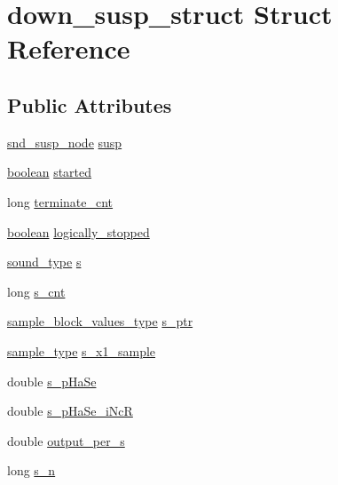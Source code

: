 \hypertarget{structdown__susp__struct}{}\section{down\+\_\+susp\+\_\+struct Struct Reference}
\label{structdown__susp__struct}
\subsection*{Public Attributes}
\begin{DoxyCompactItemize}
\item 
\hyperlink{sound_8h_a6b268203688a934bd798ceb55f85d4c0}{snd\+\_\+susp\+\_\+node} \hyperlink{structdown__susp__struct_a923a2ed178e5d5a651c53373b6e15f78}{susp}
\item 
\hyperlink{cext_8h_a7670a4e8a07d9ebb00411948b0bbf86d}{boolean} \hyperlink{structdown__susp__struct_ab03fc127790f215ff5249c3ecc013d85}{started}
\item 
long \hyperlink{structdown__susp__struct_a601adcbfe00e224ca758eaa4e52ee34a}{terminate\+\_\+cnt}
\item 
\hyperlink{cext_8h_a7670a4e8a07d9ebb00411948b0bbf86d}{boolean} \hyperlink{structdown__susp__struct_a1c0315f1ab04076b93fdcd5d3c81bbdc}{logically\+\_\+stopped}
\item 
\hyperlink{sound_8h_a792cec4ed9d6d636d342d9365ba265ea}{sound\+\_\+type} \hyperlink{structdown__susp__struct_adf58237768028da5c4def16705c02d98}{s}
\item 
long \hyperlink{structdown__susp__struct_a3562884b24c0a87540acdf32ee0739d1}{s\+\_\+cnt}
\item 
\hyperlink{sound_8h_a83d17f7b465d1591f27cd28fc5eb8a03}{sample\+\_\+block\+\_\+values\+\_\+type} \hyperlink{structdown__susp__struct_aa2fe1a57319312513af4895857b41798}{s\+\_\+ptr}
\item 
\hyperlink{sound_8h_a3a9d1d4a1c153390d2401a6e9f71b32c}{sample\+\_\+type} \hyperlink{structdown__susp__struct_a4c337ccadec812e7ca4329eea901250c}{s\+\_\+x1\+\_\+sample}
\item 
double \hyperlink{structdown__susp__struct_adcc32253278270f7b42a332916191e4e}{s\+\_\+p\+Ha\+Se}
\item 
double \hyperlink{structdown__susp__struct_aa1832011256a6e7d66a89177f93f257c}{s\+\_\+p\+Ha\+Se\+\_\+i\+NcR}
\item 
double \hyperlink{structdown__susp__struct_a4a192b064416ec8b97a4786d1ed46162}{output\+\_\+per\+\_\+s}
\item 
long \hyperlink{structdown__susp__struct_a415e03bb3f0a6bceba815b521be75d12}{s\+\_\+n}
\end{DoxyCompactItemize}


